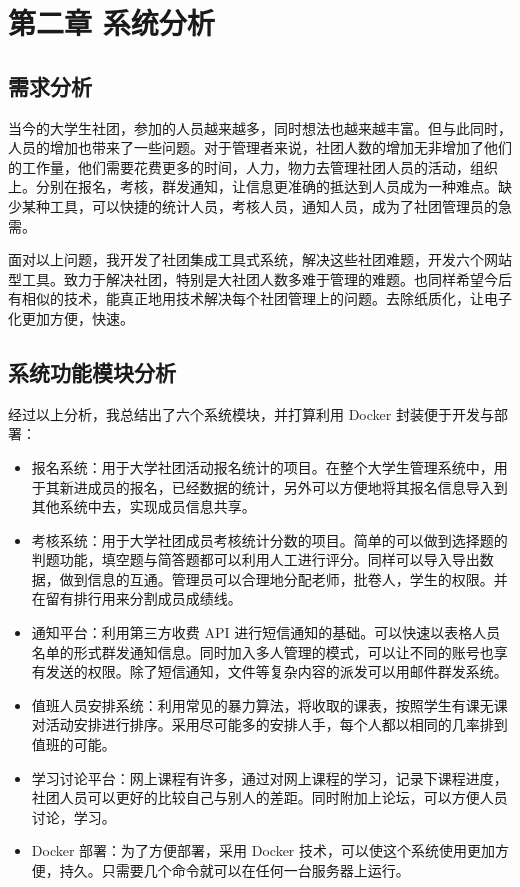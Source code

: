 \chapter{第二章 系统分析}
\label{cha:introduction}

\section{需求分析}
\label{sec:requirements}

当今的大学生社团，参加的人员越来越多，同时想法也越来越丰富。但与此同时，人员的增加也带来了一些问题。对于管理者来说，社团人数的增加无非增加了他们的工作量，他们需要花费更多的时间，人力，物力去管理社团人员的活动，组织上。分别在报名，考核，群发通知，让信息更准确的抵达到人员成为一种难点。缺少某种工具，可以快捷的统计人员，考核人员，通知人员，成为了社团管理员的急需。

面对以上问题，我开发了社团集成工具式系统，解决这些社团难题，开发六个网站型工具。致力于解决社团，特别是大社团人数多难于管理的难题。也同样希望今后有相似的技术，能真正地用技术解决每个社团管理上的问题。去除纸质化，让电子化更加方便，快速。
  
\section{系统功能模块分析}
\label{sec:requirements}

经过以上分析，我总结出了六个系统模块，并打算利用 Docker 封装便于开发与部署：
\begin{itemize}
  \item 报名系统：用于大学社团活动报名统计的项目。在整个大学生管理系统中，用于其新进成员的报名，已经数据的统计，另外可以方便地将其报名信息导入到其他系统中去，实现成员信息共享。
  \item 考核系统：用于大学社团成员考核统计分数的项目。简单的可以做到选择题的判题功能，填空题与简答题都可以利用人工进行评分。同样可以导入导出数据，做到信息的互通。管理员可以合理地分配老师，批卷人，学生的权限。并在留有排行用来分割成员成绩线。
  \item 通知平台：利用第三方收费 API 进行短信通知的基础。可以快速以表格人员名单的形式群发通知信息。同时加入多人管理的模式，可以让不同的账号也享有发送的权限。除了短信通知，文件等复杂内容的派发可以用邮件群发系统。
  \item 值班人员安排系统：利用常见的暴力算法，将收取的课表，按照学生有课无课对活动安排进行排序。采用尽可能多的安排人手，每个人都以相同的几率排到值班的可能。
  \item 学习讨论平台：网上课程有许多，通过对网上课程的学习，记录下课程进度，社团人员可以更好的比较自己与别人的差距。同时附加上论坛，可以方便人员讨论，学习。
  \item Docker 部署：为了方便部署，采用 Docker 技术，可以使这个系统使用更加方便，持久。只需要几个命令就可以在任何一台服务器上运行。
\end{itemize}
